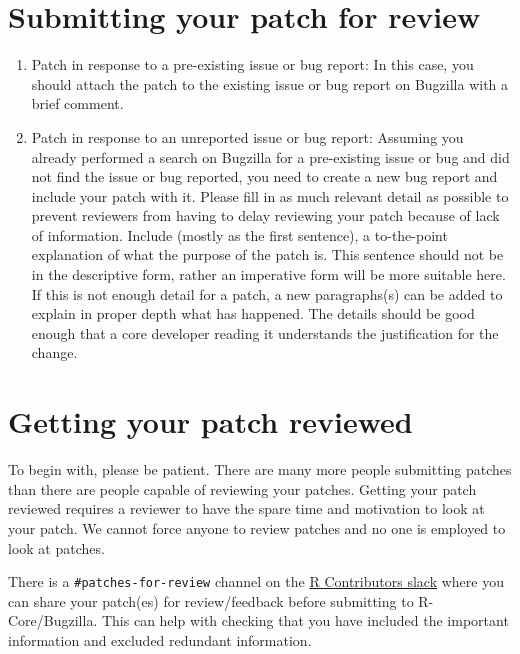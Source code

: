 \documentclass[
]{book}
\begin{document}
\hypertarget{SubmitPatches}{%
\section{Submitting your patch for review}\label{SubmitPatches}}

\begin{enumerate}
\def\labelenumi{\arabic{enumi}.}
\item
  Patch in response to a pre-existing issue or bug report: In this case, you should attach the patch to the existing issue or bug report on Bugzilla with a brief comment.
\item
  Patch in response to an unreported issue or bug report: Assuming you already performed a search on Bugzilla for a pre-existing issue or bug and did not find the issue or bug reported, you need to create a new bug report and include your patch with it. Please fill in as much relevant detail as possible to prevent reviewers from having to delay reviewing your patch because of lack of information. Include (mostly as the first sentence), a to-the-point explanation of what the purpose of the patch is. This sentence should not be in the descriptive form, rather an imperative form will be more suitable here. If this is not enough detail for a patch, a new paragraphs(s) can be added to explain in proper depth what has happened. The details should be good enough that a core developer reading it understands the justification for the change.
\end{enumerate}

\hypertarget{PatchesReview}{%
\section{Getting your patch reviewed}\label{PatchesReview}}

To begin with, please be patient. There are many more people submitting patches than there are people capable of reviewing your patches. Getting your patch reviewed requires a reviewer to have the spare time and motivation to look at your patch. We cannot force anyone to review patches and no one is employed to look at patches.

There is a \texttt{\#patches-for-review} channel on the \href{https://r-contributors.slack.com/}{R Contributors slack} where you can share your patch(es) for review/feedback before submitting to R-Core/Bugzilla. This can help with checking that you have included the important information and excluded redundant information.
\end{document}
